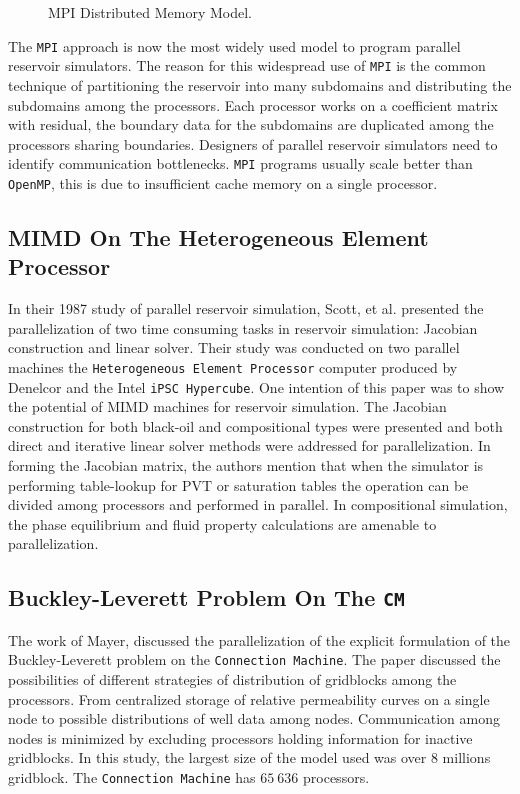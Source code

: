 \documentclass[barcolor=BrickRed,nocopyright,nolists]{asmejour}
\begin{document}
\begin{itemize}
			    \begin{figure}[h]
					\centering\scalebox{0.7}{}
			       		\caption{MPI Distributed Memory Model.}
			       		\label{mpi}
			    \end{figure}
			    The \texttt{MPI} approach is now the most widely used model to program parallel reservoir simulators. The reason for this widespread use of \texttt{MPI} is the common 
			    technique of partitioning the reservoir into many subdomains and distributing the subdomains among the processors\cite{spe29139}. 
			    Each processor works on a coefficient matrix with residual, the boundary data for the subdomains are duplicated among the processors sharing boundaries.
			    Designers of parallel reservoir simulators need to identify communication bottlenecks. \texttt{MPI} programs usually scale better than \texttt{OpenMP}, this is due to 
			    insufficient cache memory on a single processor.
\end{itemize}

\subsection{MIMD On The Heterogeneous Element Processor}
In their 1987 study of parallel reservoir simulation, Scott, et al.\cite{spe16020} presented the parallelization of two time consuming tasks in reservoir simulation: Jacobian construction and linear solver.
Their study was conducted on two parallel machines the \texttt{Heterogeneous Element Processor} computer produced by Denelcor and the Intel \texttt{iPSC Hypercube}. One intention of this paper was to show
the potential of MIMD machines for reservoir simulation. The Jacobian construction for both black-oil and compositional types were presented and both direct and iterative linear solver methods were addressed 
for parallelization. In forming the Jacobian matrix, the authors mention that when the simulator is performing table-lookup for PVT or saturation tables the operation can be divided among processors and performed
in parallel. In compositional simulation, the phase equilibrium and fluid property calculations are amenable to parallelization.

\subsection{Buckley-Leverett Problem On The \texttt{CM}}
The work of Mayer\cite{spe19121}, discussed the parallelization of the explicit formulation of the Buckley-Leverett problem on the \texttt{Connection Machine}. The paper discussed the possibilities of different strategies
of distribution of gridblocks among the processors. From centralized storage of relative permeability curves on a single node to possible distributions of well data among nodes. Communication among nodes is minimized by excluding processors holding information
for inactive gridblocks. In this study, the largest size of the model used was over $8$ millions gridblock. The \texttt{Connection Machine} has $65 \ 636$ processors.
\end{document}
